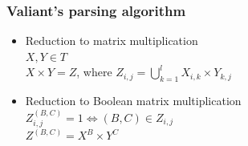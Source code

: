 \documentclass[xcolor=table]{beamer}
\begin{document}
\begin{frame}[fragile] \frametitle{Valiant's parsing algorithm}

\begin{itemize}
    \item Reduction to matrix multiplication \\ \vspace{4}
    $X, Y \in T$ \\
    $X \times Y = Z$, where $Z_{i, j} = \bigcup\limits_{k = 1}^{l} X_{i, k} \times Y_{k, j}$
    
    \item Reduction to Boolean matrix multiplication \\ \vspace{4}
    $Z_{i, j}^{(B, C)} = 1 \iff (B, C) \in Z_{i, j}$ \\ \vspace{2}
    $Z^{(B, C)} = X^{B} \times Y^{C}$
    
\end{itemize}

\end{frame}
\end{document}
